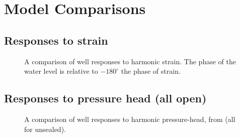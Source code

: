\documentclass[12pt]{article}
\begin{document}
\clearpage
\section{Model Comparisons}

\subsection{Responses to strain}
\begin{figure}[htb!]
\begin{center}
\caption{A comparison of well responses to harmonic strain. 
The phase of the water level is relative to $-180^\circ$ the phase of strain.}
\label{fig:ewrsp-all}
\end{center}
\end{figure}

\clearpage
\subsection{Responses to pressure head (all open)}
\begin{figure}[htb!]
\begin{center}
\caption{A comparison of well responses to harmonic pressure-head, 
from \citet{cooper1965, hsieh1987, liu1989} (all for unsealed).}
\label{fig:owrsp-all}
\end{center}
\end{figure}



\end{document}
